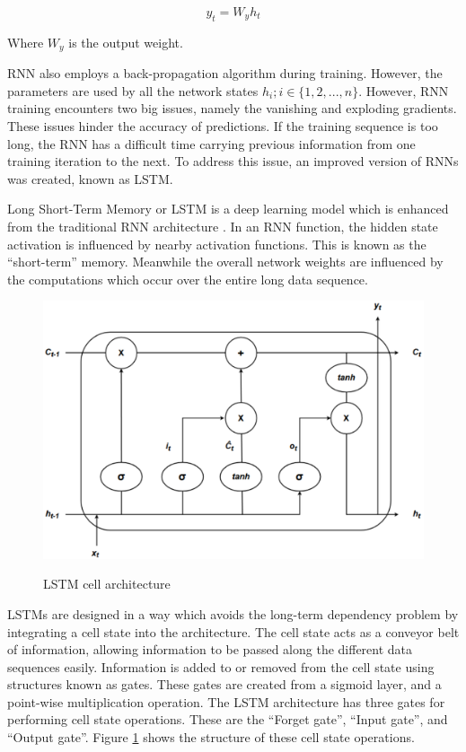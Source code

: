 \begin{equation}
    y_{t} = W_{y}h_{t}
\end{equation}

Where $W_{y}$ is the output weight.\par

RNN also employs a back-propagation algorithm during training. However, the parameters are used by all the network states $h_{i}; i \in \{1, 2, ... , n\}$. However, RNN training encounters two big issues, namely the vanishing and exploding gradients. These issues hinder the accuracy of predictions. If the training sequence is too long, the RNN has a difficult time carrying previous information from one training iteration to the next. To address this issue, an improved version of RNNs was created, known as LSTM.\par

Long Short-Term Memory or LSTM is a deep learning model which is enhanced from the traditional RNN architecture \cite{lindemann2021survey}. In an RNN function, the hidden state activation is influenced by nearby activation functions. This is known as the ``short-term'' memory. Meanwhile the overall network weights are influenced by the computations which occur over the entire long data sequence.\par

\begin{figure}[htb]
    \centering
    \caption{LSTM cell architecture}
    \includegraphics[width=0.8\linewidth]{Figures/LSTM-Cell-Architecture.pdf}
    \label{fig:lstm-cell-architecture}
\end{figure}

LSTMs are designed in a way which avoids the long-term dependency problem by integrating a cell state into the architecture. The cell state acts as a conveyor belt of information, allowing information to be passed along the different data sequences easily. Information is added to or removed from the cell state using structures known as gates. These gates are created from a sigmoid layer, and a point-wise multiplication operation. The LSTM architecture has three gates for performing cell state operations. These are the ``Forget gate'', ``Input gate'', and ``Output gate''. Figure \ref{fig:lstm-cell-architecture} shows the structure of these cell state operations.\par

